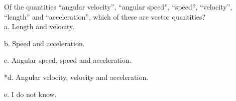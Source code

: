 
Of the quantities ``angular velocity'', ``angular speed'', ``speed'', ``velocity'', ``length'' and ``acceleration'', which of these are vector quantities? \\

a. Length and velocity.

b. Speed and acceleration.

c. Angular speed, speed and acceleration.

*d. Angular velocity, velocity and acceleration.

e. I do not know. \\
